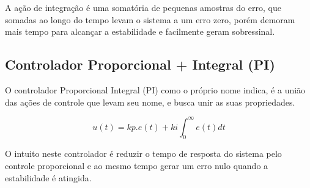 




A ação de integração é uma somatória de pequenas amostras do erro, que somadas ao longo do tempo levam o sistema a um erro zero, porém demoram mais tempo para alcançar a estabilidade e facilmente geram sobressinal.










\subsection{ Controlador Proporcional + Integral (PI) }

O controlador Proporcional Integral (PI) como o próprio nome indica, é a união das ações de controle que levam seu nome, e busca unir as suas propriedades.
 
\begin{equation}
u(t) = kp.e(t) + ki \int_{0}^{\infty} e(t) dt
\end{equation}


O intuito neste controlador é reduzir o tempo de resposta do sistema pelo controle proporcional e ao mesmo tempo gerar um erro nulo quando a estabilidade é atingida.





